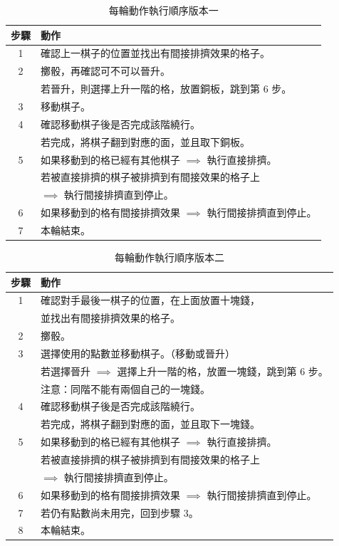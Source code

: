 \documentclass[11pt,a4paper]{article}
\begin{document}
\begin{table}
	\caption{每輪動作執行順序版本一}
	\label{order_one}
	\centering
	\vspace{0.1cm}
	\begin{tabular}{cl}
		\toprule
			步驟 & 動作\\
		\midrule
			1 & 確認上一棋子的位置並找出有間接排擠效果的格子。\\
			2 & 擲骰，再確認可不可以晉升。\\
			  & 若晉升，則選擇上升一階的格，放置銅板，跳到第 6 步。\\
			3 & 移動棋子。\\
			4 & 確認移動棋子後是否完成該階繞行。\\
			  & 若完成，將棋子翻到對應的面，並且取下銅板。\\
			5 & 如果移動到的格已經有其他棋子 $\implies$ 執行直接排擠。\\
			  & 若被直接排擠的棋子被排擠到有間接效果的格子上\\
			  & $\implies$ 執行間接排擠直到停止。\\
			6 & 如果移動到的格有間接排擠效果 $\implies$ 執行間接排擠直到停止。\\
			7 & 本輪結束。\\
		\bottomrule
	\end{tabular}
\end{table}

\begin{table}
	\caption{每輪動作執行順序版本二}
	\label{order_two}
	\centering
	\vspace{0.1cm}
	\begin{tabular}{cl}
		\toprule
			步驟 & 動作\\
		\midrule
			1 & 確認對手最後一棋子的位置，在上面放置十塊錢，\\
			  & 並找出有間接排擠效果的格子。\\
			2 & 擲骰。\\
			\midrule
			3 & 選擇使用的點數並移動棋子。（移動或晉升）\\
			  & 若選擇晉升 $\implies$ 選擇上升一階的格，放置一塊錢，跳到第 6 步。\\
			  & \textsf{注意}：同階不能有兩個自己的一塊錢。\\
			4 & 確認移動棋子後是否完成該階繞行。\\
			  & 若完成，將棋子翻到對應的面，並且取下一塊錢。\\
			5 & 如果移動到的格已經有其他棋子 $\implies$ 執行直接排擠。\\
			  & 若被直接排擠的棋子被排擠到有間接效果的格子上\\
			  & $\implies$ 執行間接排擠直到停止。\\
			6 & 如果移動到的格有間接排擠效果 $\implies$ 執行間接排擠直到停止。\\
			7 & 若仍有點數尚未用完，回到步驟 3。\\
			8 & 本輪結束。\\
		\bottomrule
	\end{tabular}
\end{table}
\end{document}

